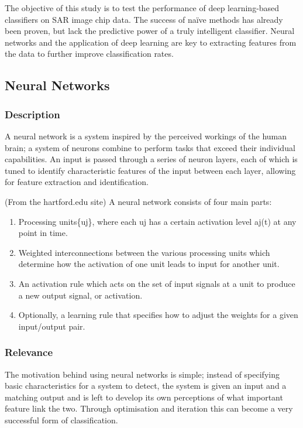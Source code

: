 The objective of this study is to test the performance of deep learning-based classifiers on SAR image chip data. The success of na{\"i}ve methods has already been proven\cite{Schumacher_atrof}, but lack the predictive power of a truly intelligent classifier. Neural networks and the application of deep learning are key to extracting features from the data to further improve classification rates.

\subsection{Neural Networks}
\subsubsection{Description}
A neural network is a system inspired by the perceived workings of the human brain; a system of neurons combine to perform tasks that exceed their individual capabilities. An input is passed through a series of neuron layers, each of which is tuned to identify characteristic features of the input between each layer, allowing for feature extraction and identification. 

(From the hartford.edu site)
A neural network consists of four main parts\cite{neural_def_russel}:
\begin{enumerate}
	\item Processing units\{uj\}, where each uj has a certain activation level aj(t) at any point in time.
	\item Weighted interconnections between the various processing units which determine how the activation of one unit leads to input for another unit.
	\item An activation rule which acts on the set of input signals at a unit to produce a new output signal, or activation.
	\item Optionally, a learning rule that specifies how to adjust the weights for a given input/output pair.
\end{enumerate}


\subsubsection{Relevance}
The motivation behind using neural networks is simple; instead of specifying basic characteristics for a system to detect, the system is given an input and a matching output and is left to develop its own perceptions of what important feature link the two. Through optimisation and iteration this can become a very successful form of classification.

